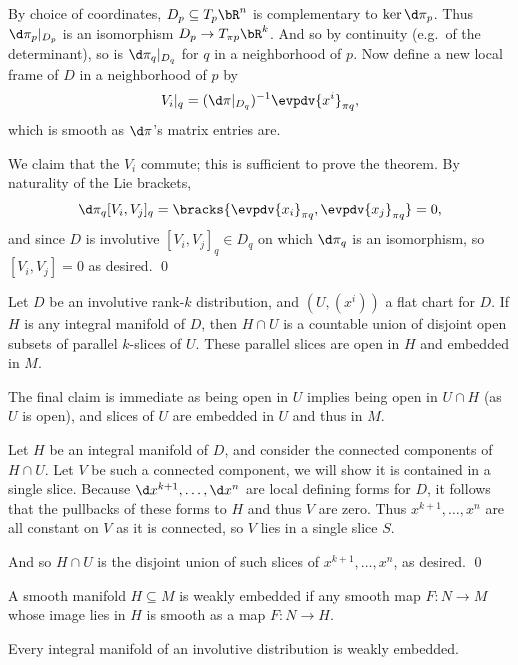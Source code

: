     By choice of coordinates, $D_p\subseteq T_p\bR^n$ is complementary to $\ker\d\pi_p$.
    Thus $\d\pi_p|_{D_p}$ is an isomorphism $D_p\to T_{\pi p}\bR^k$.
    And so by continuity (e.g.\ of the determinant), so is $\d\pi_q|_{D_q}$ for $q$ in a neighborhood of $p$.
    Now define a new local frame of $D$ in a neighborhood of $p$ by
    $$ V_i|_q = (\d\pi|_{D_q})^{-1}\evpdv{x^i}_{\pi q} , $$
    which is smooth as $\d\pi$'s matrix entries are.

    We claim that the $V_i$ commute; this is sufficient to prove the theorem.
    By naturality of the Lie brackets,
    $$ \d\pi_q[V_i,V_j]_q = \bracks{\evpdv{x_i}_{\pi q},\evpdv{x_j}_{\pi q}} = 0 , $$
    and since $D$ is involutive $[V_i,V_j]_q\in D_q$ on which $\d\pi_q$ is an isomorphism, so $[V_i,V_j]=0$ as desired.
    \qed

\eproof

\blemm

    Let $D$ be an involutive rank-$k$ distribution, and $(U,(x^i))$ a flat chart for $D$.
    If $H$ is any integral manifold of $D$, then $H\cap U$ is a countable union of disjoint open subsets of parallel $k$-slices of $U$.
    These parallel slices are open in $H$ and embedded in $M$.

\elemm

\bproof

    The final claim is immediate as being open in $U$ implies being open in $U\cap H$ (as $U$ is open), and slices of $U$ are embedded in $U$ and thus in $M$.

    Let $H$ be an integral manifold of $D$, and consider the connected components of $H\cap U$.
    Let $V$ be such a connected component, we will show it is contained in a single slice.
    Because $\d x^{k+1},\dots,\d x^n$ are local defining forms for $D$, it follows that the pullbacks of these forms to $H$ and thus $V$ are zero.
    Thus $x^{k+1},\dots,x^n$ are all constant on $V$ as it is connected, so $V$ lies in a single slice $S$.

    And so $H\cap U$ is the disjoint union of such slices of $x^{k+1},\dots,x^n$, as desired.
    \qed

\eproof

A smooth manifold $H\subseteq M$ is {\emphcolor weakly embedded} if any smooth map $F\colon N\to M$ whose image lies in $H$ is smooth as a map $F\colon N\to H$.

\bthrm

    Every integral manifold of an involutive distribution is weakly embedded.

